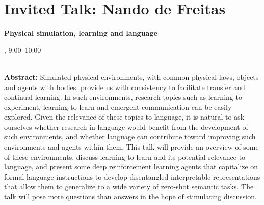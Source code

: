 \section{Invited Talk: Nando de Freitas}

\begin{center}
\begin{Large}
{\bfseries\Large Physical simulation, learning and language}
\vspace{1em}\par
\end{Large}

\daydateyear, 9:00--10:00 \vspace{1em}\\
\PlenaryLoc \\
\vspace{1em}\par
\end{center}

\noindent
{\bfseries Abstract:} Simulated physical environments, with common physical laws, objects and agents with bodies, provide us with consistency to facilitate transfer and continual learning. In such environments, research topics such as learning to experiment, learning to learn and emergent communication can be easily explored. Given the relevance of these topics to language, it is natural to ask ourselves whether research in language would benefit from the development of such environments, and whether language can contribute toward improving such environments and agents within them. This talk will provide an overview of some of these environments, discuss learning to learn and its potential relevance to language, and present some deep reinforcement learning agents that capitalize on formal language instructions to develop disentangled interpretable representations that allow them to generalize to a wide variety of zero-shot semantic tasks. The talk will pose more questions than answers in the hope of stimulating discussion. 

\vspace{3em}\par 

\vfill
\noindent

